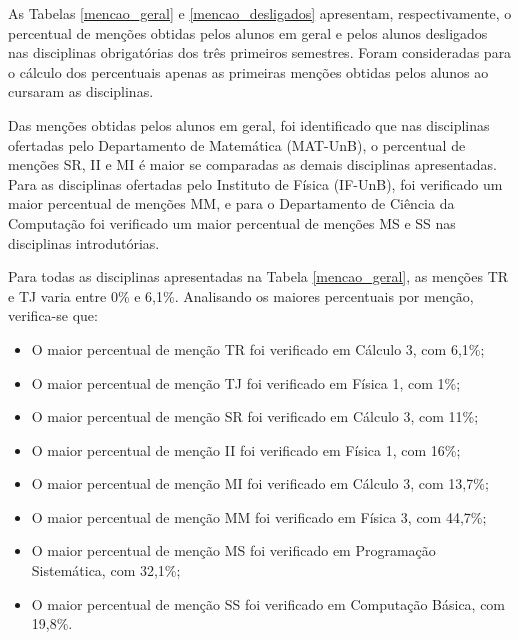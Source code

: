 As Tabelas \ref{mencao_geral} e \ref{mencao_desligados} apresentam, respectivamente, o percentual de menções obtidas pelos alunos em geral e pelos alunos desligados nas disciplinas obrigatórias dos três primeiros semestres. Foram consideradas para o cálculo dos percentuais apenas as primeiras menções obtidas pelos alunos ao cursaram as disciplinas. 

Das menções obtidas pelos alunos em geral, foi identificado que nas disciplinas ofertadas pelo Departamento de Matemática (MAT-UnB), o percentual de menções SR, II e MI é maior se comparadas as demais disciplinas apresentadas. Para as disciplinas ofertadas pelo Instituto de Física (IF-UnB), foi verificado um maior percentual de menções MM, e para o Departamento de Ciência da Computação foi verificado um maior percentual de menções MS e SS nas disciplinas introdutórias. 

Para todas as disciplinas apresentadas na Tabela \ref{mencao_geral}, as menções TR e TJ varia entre 0\% e 6,1\%. Analisando os maiores percentuais por menção, verifica-se que:
\begin{itemize}
	\item O maior percentual de menção TR foi verificado em Cálculo 3, com 6,1\%;
	\item O maior percentual de menção TJ foi verificado em Física 1, com 1\%;
	\item O maior percentual de menção SR foi verificado em Cálculo 3, com 11\%;
	\item O maior percentual de menção II foi verificado em Física 1, com 16\%;
	\item O maior percentual de menção MI foi verificado em Cálculo 3, com 13,7\%;
	\item O maior percentual de menção MM foi verificado em Física 3, com 44,7\%;
	\item O maior percentual de menção MS foi verificado em Programação Sistemática, com 32,1\%;
	\item O maior percentual de menção SS foi verificado em Computação Básica, com 19,8\%.
	\end{itemize}

